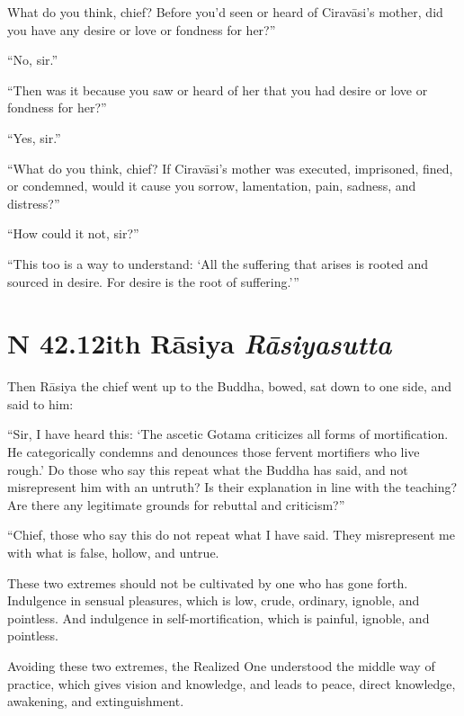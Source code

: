 \documentclass[12pt,openany]{book}%
\newcommand*{\suttatitleacronym}[1]{\smaller[2]{#1}\vspace*{.3em}}
\newcommand*{\suttatitletranslation}[1]{\linebreak{#1}}
\newcommand*{\suttatitleroot}[1]{\linebreak\smaller[2]\itshape{#1}}
\newcommand*{\tocacronym}[1]{\hspace*{-3.3em}{#1}\quad}
\newcommand*{\toctranslation}[1]{#1}
\newcommand*{\tocroot}[1]{(\textit{#1})}
\begin{document}
What do you think, chief? Before you’d seen or heard of \textsanskrit{Ciravāsi}’s mother, did you have any desire or love or fondness for her?” 

“No, sir.” 

“Then was it because you saw or heard of her that you had desire or love or fondness for her?” 

“Yes, sir.” 

“What do you think, chief? If \textsanskrit{Ciravāsi}’s mother was executed, imprisoned, fined, or condemned, would it cause you sorrow, lamentation, pain, sadness, and distress?” 

“How could it not, sir?” 

“This too is a way to understand: ‘All the suffering that arises is rooted and sourced in desire. For desire is the root of suffering.’” 

%
\section*{{\suttatitleacronym SN 42.12}{\suttatitletranslation With Rāsiya }{\suttatitleroot Rāsiyasutta}}
\addcontentsline{toc}{section}{\tocacronym{SN 42.12} \toctranslation{With Rāsiya } \tocroot{Rāsiyasutta}}

Then \textsanskrit{Rāsiya} the chief went up to the Buddha, bowed, sat down to one side, and said to him: 

“Sir, I have heard this: ‘The ascetic Gotama criticizes all forms of mortification. He categorically condemns and denounces those fervent mortifiers who live rough.’ Do those who say this repeat what the Buddha has said, and not misrepresent him with an untruth? Is their explanation in line with the teaching? Are there any legitimate grounds for rebuttal and criticism?” 

“Chief, those who say this do not repeat what I have said. They misrepresent me with what is false, hollow, and untrue. 

These two extremes should not be cultivated by one who has gone forth. Indulgence in sensual pleasures, which is low, crude, ordinary, ignoble, and pointless. And indulgence in self-mortification, which is painful, ignoble, and pointless. 

Avoiding these two extremes, the Realized One understood the middle way of practice, which gives vision and knowledge, and leads to peace, direct knowledge, awakening, and extinguishment. 
\end{document}
